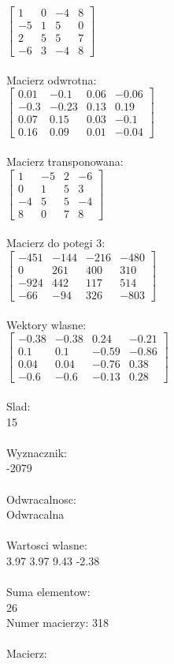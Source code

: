 \documentclass[a4paper,12pt]{article}
\begin{document}
$\begin{bmatrix} 1&0&-4&8\\-5&1&5&0\\2&5&5&7\\-6&3&-4&8 \end{bmatrix}$
\\
\\
Macierz odwrotna:\\

$\begin{bmatrix} 0.01&-0.1&0.06&-0.06\\-0.3&-0.23&0.13&0.19\\0.07&0.15&0.03&-0.1\\0.16&0.09&0.01&-0.04 \end{bmatrix}$
\\
\\
Macierz transponowana:\\

$\begin{bmatrix} 1&-5&2&-6\\0&1&5&3\\-4&5&5&-4\\8&0&7&8 \end{bmatrix}$
\\
\\
Macierz do potegi 3:\\

$\begin{bmatrix} -451&-144&-216&-480\\0&261&400&310\\-924&442&117&514\\-66&-94&326&-803 \end{bmatrix}$
\\
\\
Wektory wlasne:\\

$\begin{bmatrix} -0.38&-0.38&0.24&-0.21\\0.1&0.1&-0.59&-0.86\\0.04&0.04&-0.76&0.38\\-0.6&-0.6&-0.13&0.28 \end{bmatrix}$
\\
\\
Slad:\\
15
\\
\\
Wyznacznik:\\
-2079
\\
\\
Odwracalnosc:\\
Odwracalna
\\
\\
Wartosci wlasne:\\
3.97 3.97 9.43 -2.38
\\
\\
Suma elementow:\\
26
\\
\newpage
Numer macierzy:
318
\\
\\
Macierz:\\
\end{document}
